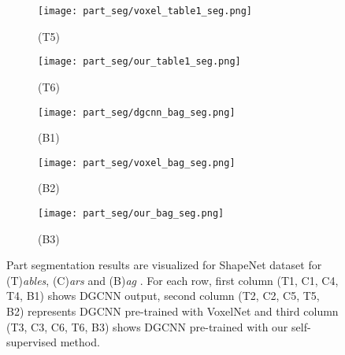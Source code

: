 \documentclass{article}
\begin{document}
\begin{figure}
\begin{subfigure}{.32\textwidth}
		\centering
		\texttt{[image: part\_seg/voxel\_table1\_seg.png]}
		\caption*{(T5)}
		\label{fig:seg17}
    \end{subfigure}\begin{subfigure}{.32\textwidth}
		\centering
		\texttt{[image: part\_seg/our\_table1\_seg.png]}
		\caption*{(T6)}
		\label{fig:seg18}
	\end{subfigure}
	\begin{subfigure}{.32\textwidth}
		\centering
		\texttt{[image: part\_seg/dgcnn\_bag\_seg.png]}
		\caption*{(B1)}
		\label{fig:seg19}
    \end{subfigure}\begin{subfigure}{.32\textwidth}
		\centering
		\texttt{[image: part\_seg/voxel\_bag\_seg.png]}
		\caption*{(B2)}
		\label{fig:seg20}
    \end{subfigure}\begin{subfigure}{.32\textwidth}
		\centering
		\texttt{[image: part\_seg/our\_bag\_seg.png]}
		\caption*{(B3)}
		\label{fig:seg21}
	\end{subfigure}\caption{Part segmentation results are visualized for ShapeNet dataset for (T)\emph{ables}, (C)\emph{ars} and (B)\emph{ag} . For each row, first column (T1, C1, C4, T4, B1) shows DGCNN output, second column (T2, C2, C5, T5, B2) represents DGCNN pre-trained with VoxelNet and third column (T3, C3, C6, T6, B3) shows DGCNN pre-trained with our self-supervised method.}
	\label{fig:partseg2}
\end{figure}
\end{document}
